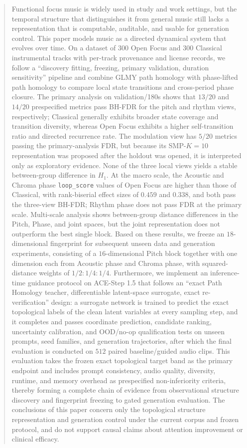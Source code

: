 \documentclass{article}
\begin{document}
\begin{abstract}
  Functional focus music is widely used in study and work settings, but the temporal structure that distinguishes it from general music still lacks a representation that is computable, auditable, and usable for generation control. This paper models music as a directed dynamical system that evolves over time. On a dataset of $300$ Open Focus and $300$ Classical instrumental tracks with per-track provenance and license records, we follow a ``discovery fitting, freezing, primary validation, duration sensitivity'' pipeline and combine GLMY path homology with phase-lifted path homology to compare local state transitions and cross-period phase closure. The primary analysis on validation/180s shows that $13/20$ and $14/20$ prespecified metrics pass BH-FDR for the pitch and rhythm views, respectively; Classical generally exhibits broader state coverage and transition diversity, whereas Open Focus exhibits a higher self-transition ratio and directed recurrence rate. The modulation view has $5/20$ metrics passing the primary-analysis FDR, but because its SMP-$K=10$ representation was proposed after the holdout was opened, it is interpreted only as exploratory evidence. None of the three local views yields a stable between-group difference in $H_1$. At the macro scale, the Acoustic and Chroma phase \texttt{loop\_score} values of Open Focus are higher than those of Classical, with rank-biserial effect sizes of $0.459$ and $0.338$, and both pass the three-view BH-FDR; Rhythm phase does not pass FDR at the primary scale. Multi-scale analysis shows between-group distance differences in the Pitch, Phase, and joint spaces, but the joint representation does not outperform the best single block. Based on these results, we freeze an $18$-dimensional fingerprint for subsequent unseen data and generation experiments, consisting of a $16$-dimensional Pitch block together with one dimension each from Acoustic phase and Chroma phase, with squared-distance weights of $1/2:1/4:1/4$. Furthermore, we implement an inference-time guidance protocol on ACE-Step 1.5 that follows an ``exact Path Homology teacher, differentiable latent-space surrogate, exact re-verification'' design: a surrogate network is trained to predict the exact topological labels of the clean latent variables at every sampling step, and it completes and passes coordinate prediction, candidate ranking, uncertainty calibration, and OOD/no-op qualification tests on unseen prompts, seed families, and generation trajectories, after which the final evaluation is conducted on $512$ paired baseline/guided audio clips. This evaluation takes the frozen exact topological target band as the primary endpoint and includes prompt consistency, audio quality, diversity, runtime, and memory overhead as prespecified non-inferiority criteria, thereby forming a complete chain of evidence from observational structure discovery and fingerprint freezing to gated generation evaluation. The conclusions of this paper concern only the topological structure representation and generation control under the current corpus and frozen protocol, and do not support causal claims about attention improvement or clinical efficacy.
\end{abstract}
\end{document}
